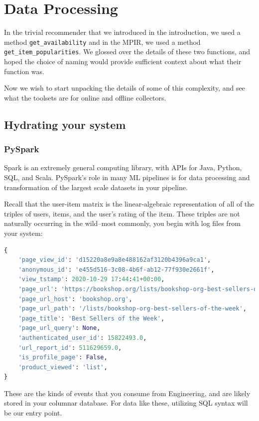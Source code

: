 \chapter{Data Processing}
\label{ch:data-processing}

In the trivial recommender that we introduced in the introduction, we used a method \lstinline{get_availability} and in the MPIR, we used a method \lstinline{get_item_popularities}. We glossed over the details of these two functions, and hoped the choice of naming would provide sufficient context about what their function was. 

Now we wish to start unpacking the details of some of this complexity, and see what the toolsets are for online and offline collectors.

\section{Hydrating your system}

\subsection{PySpark}

Spark is an extremely general computing library, with APIs for Java, Python, SQL, and Scala. PySpark's role in many ML pipelines is for data processing and transformation of the largest scale datasets in your pipeline. 

Recall that the user-item matrix is the linear-algebraic representation of all of the triples of users, items, and the user's rating of the item. These triples are not naturally occurring in the wild–most commonly, you begin with log files from your system:

\begin{lstlisting}[language=python]
{
	'page_view_id': 'd15220a8e9a8e488162af3120b4396a9ca1', 
	'anonymous_id': 'e455d516-3c08-4b6f-ab12-77f930e2661f', 
	'view_tstamp': 2020-10-29 17:44:41+00:00, 
	'page_url': 'https://bookshop.org/lists/bookshop-org-best-sellers-of-the-week', 
	'page_url_host': 'bookshop.org', 
	'page_url_path': '/lists/bookshop-org-best-sellers-of-the-week', 
	'page_title': 'Best Sellers of the Week', 
	'page_url_query': None, 
	'authenticated_user_id': 15822493.0, 
	'url_report_id': 511629659.0, 
	'is_profile_page': False, 
	'product_viewed': 'list', 
}
\end{lstlisting}

These are the kinds of events that you consume from Engineering, and are likely stored in your columnar database. For data like these, utilizing SQL syntax will be our entry point.

